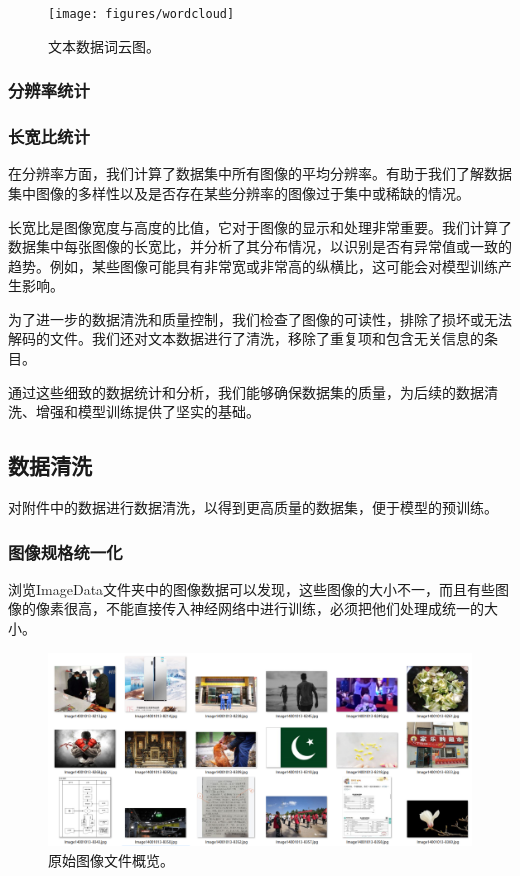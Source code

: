 \documentclass[a4paper]{zreport}
\begin{document}
\begin{figure}[h]
\centering
\texttt{[image: figures/wordcloud]}
\caption{文本数据词云图。}
\label{fig:wordcloud}
\end{figure}


\subsubsection{分辨率统计}

\subsubsection{长宽比统计}

在分辨率方面，我们计算了数据集中所有图像的平均分辨率。有助于我们了解数据集中图像的多样性以及是否存在某些分辨率的图像过于集中或稀缺的情况。

长宽比是图像宽度与高度的比值，它对于图像的显示和处理非常重要。我们计算了数据集中每张图像的长宽比，并分析了其分布情况，以识别是否有异常值或一致的趋势。例如，某些图像可能具有非常宽或非常高的纵横比，这可能会对模型训练产生影响。

为了进一步的数据清洗和质量控制，我们检查了图像的可读性，排除了损坏或无法解码的文件。我们还对文本数据进行了清洗，移除了重复项和包含无关信息的条目。

通过这些细致的数据统计和分析，我们能够确保数据集的质量，为后续的数据清洗、增强和模型训练提供了坚实的基础。

\subsection{数据清洗}
对附件中的数据进行数据清洗，以得到更高质量的数据集，便于模型的预训练。

\subsubsection{图像规格统一化}

浏览ImageData文件夹中的图像数据可以发现，这些图像的大小不一，而且有些图像的像素很高，不能直接传入神经网络中进行训练，必须把他们处理成统一的大小。

\begin{figure}[h]
\centering
\includegraphics[width=0.95\linewidth]{figures/raw_image}
\caption{原始图像文件概览。}
\label{fig:rawimage}
\end{figure}
\end{document}
